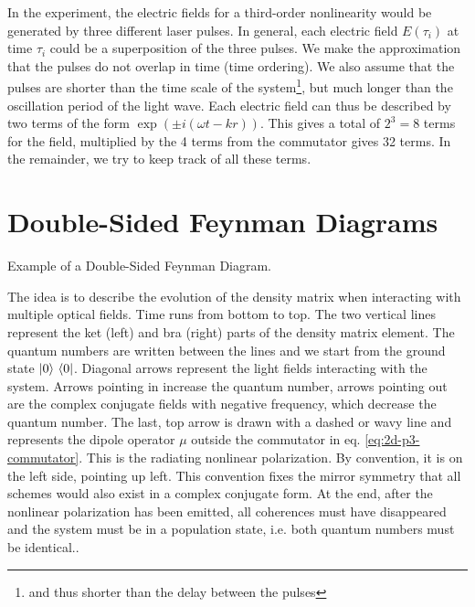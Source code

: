 In the experiment, the electric fields for a third-order nonlinearity would be generated by three different laser pulses. In general, each electric field $E(\tau_i)$ at time $\tau_i$ could be a superposition of the three pulses. We make the approximation that the pulses do not overlap in time (time ordering). We also assume that the pulses are shorter than the time scale of the system\footnote{and thus shorter than the delay between the pulses}, but much longer than the oscillation period of the light wave. Each electric field can thus be described by two terms of the form $\exp( \pm i (\omega t - k r) )$. This gives a total of $2^3=8$ terms for the field, multiplied by the 4 terms from the commutator gives 32 terms.
In the remainder, we try to keep track of all these terms.



\section{Double-Sided Feynman Diagrams}

\begin{marginfigure}
\caption{
Example of a Double-Sided Feynman Diagram.}
\label{fig:2d_example_feynman}
\end{marginfigure}

The idea is to describe the evolution of the density matrix when interacting with multiple optical fields.
Time runs from bottom to top. The two vertical lines represent the ket (left) and bra (right) parts of the density matrix element. The quantum numbers are written between the lines and we start from the ground state $\ket{0}\, \bra{0}$. Diagonal arrows represent the light fields interacting with the system. Arrows pointing in increase the quantum number, arrows pointing out are the complex conjugate fields with negative frequency, which decrease the quantum number. The last, top arrow is drawn with a dashed or wavy line and represents the dipole operator $\mu$ outside the commutator in eq. \ref{eq:2d-p3-commutator}. This is the radiating nonlinear polarization. By convention, it is on the left side, pointing up left. This convention fixes the mirror symmetry that all schemes would also exist in a complex conjugate form. At the end, after the nonlinear polarization has been emitted, all coherences must have disappeared and the system must be in a population state, i.e. both quantum numbers must be identical..



